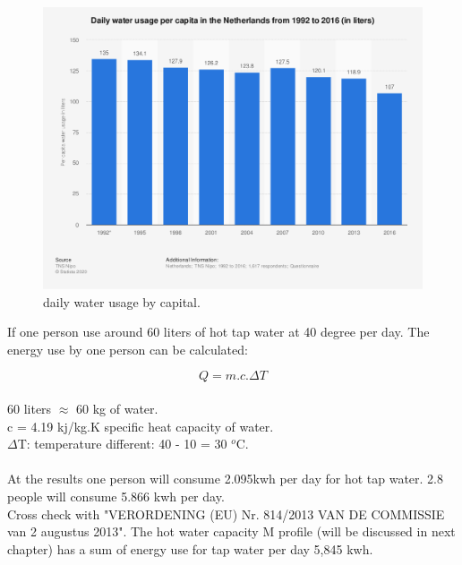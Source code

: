 \documentclass[a4paper,10pt]{article}
\begin{document}
\begin{figure}[H]
\centering
\includegraphics[width=1\columnwidth]{pictures/daily water usage.png}
\caption[Short title]{daily water usage by capital.}
\label{fig:ff4}\end{figure}


If one person use around 60 liters of hot tap water at 40 degree per day. The energy use by one person can be calculated:

\begin{equation}
Q = m.c.\Delta T
\end{equation}
\\
60 liters $\approx$ 60 kg of water.\\
c = 4.19 kj/kg.K specific heat capacity of water.\\
$\Delta$T: temperature different: 40 - 10 = 30 $^o$C.\\ 
\\
At the results one person will consume 2.095kwh per day for hot tap water. 2.8 people will consume 5.866 kwh per day.\\
Cross check with "VERORDENING (EU) Nr. 814/2013 VAN DE COMMISSIE van 2 augustus 2013". The hot water capacity M profile (will be discussed in next chapter) has a sum of energy use for tap water per day 5,845 kwh.
\end{document}
